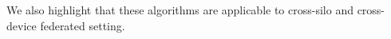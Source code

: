 \documentclass[twoside]{article}
\begin{document}
%
%
We also highlight that these algorithms are  applicable to cross-silo and cross-device federated setting.
\vspace{-0.05in}
\end{document}
